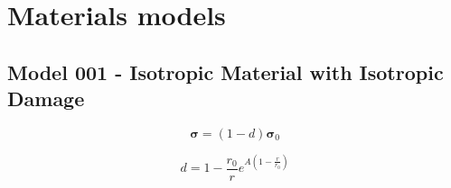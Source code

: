 \chapter*{Materials models}




\section{Model 001 - Isotropic Material with Isotropic Damage}

\begin{equation}
\boldsymbol{\sigma} = (1-d) \boldsymbol{\sigma}_{0}
\end{equation}

\begin{equation}
d = 1 - \frac{r_0}{r} e^{A\left( 1- \frac{r}{r_0} \right)}
\end{equation}

